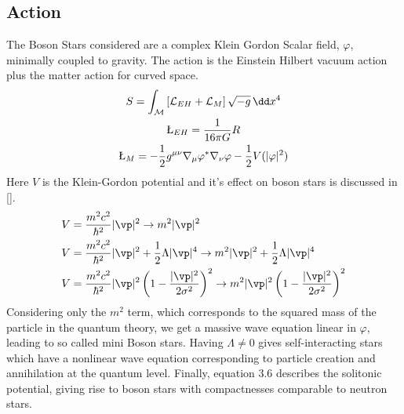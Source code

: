 \subsection{Action}
The Boson Stars considered are a complex Klein Gordon Scalar field, $\varphi$, minimally coupled to gravity. The action is the Einstein Hilbert vacuum action plus the matter action for curved space.
\begin{gather} S = \int_\mathcal{M}\left[\mathcal{L}_{EH} + \mathcal{L}_M\right] \sqrt{-g}\,\dd x^4 \\
 \L_{EH} = \frac{1}{16\pi G}R \\
 \L_{M} =-\frac{1}{2}g^{\mu\nu}\nabla_\mu \varphi^* \nabla_\nu \varphi - \frac{1}{2}V(|\varphi|^2)  \end{gather}
Here $V$ is the Klein-Gordon potential and it's effect on boson stars is discussed in [].
\begin{align}
V &= \frac{m^2 c^2}{\hbar^2 }|\vp|^2 \rightarrow m^2 |\vp|^2\\
V &= \frac{m^2 c^2}{\hbar^2 }|\vp|^2 + \frac{1}{2}\Lambda|\vp|^4 \rightarrow m^2|\vp|^2 + \frac{1}{2}\Lambda|\vp|^4\\
V &= \frac{m^2 c^2}{\hbar^2 }|\vp|^2\left(1-\frac{|\vp|^2}{2\sigma^2}\right)^2 \rightarrow {m^2 }|\vp|^2\left(1-\frac{|\vp|^2}{2\sigma^2}\right)^2
\end{align}
Considering only the $m^2$ term, which corresponds to the squared mass of the particle in the quantum theory, we get a massive wave equation linear in $\varphi$, leading to so called mini Boson stars. Having $\Lambda\neq0$ gives self-interacting stars which have a nonlinear wave equation corresponding to particle creation and annihilation at the quantum level. Finally, equation 3.6 describes the solitonic potential, giving rise to boson stars with compactnesses comparable to neutron stars. 

